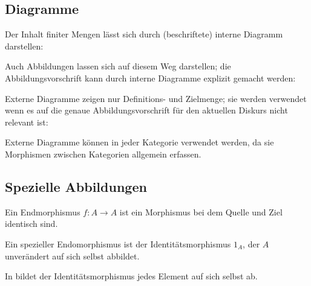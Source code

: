 \documentclass[parskip=half]{scrreprt}
\begin{document}
\newpage
\subsection{Diagramme}

\begin{remark}
Der Inhalt finiter Mengen lässt sich durch (beschriftete) interne Diagramm 
darstellen:


Auch Abbildungen lassen sich auf diesem Weg darstellen;
die Abbildungsvorschrift kann durch interne Diagramme explizit gemacht werden:

\end{remark}

\begin{remark}
Externe Diagramme zeigen nur Definitions- und Zielmenge; 
sie werden verwendet wenn es auf die genaue Abbildungsvorschrift für den 
aktuellen Diskurs nicht relevant ist:


Externe Diagramme können in jeder Kategorie verwendet werden,
da sie Morphismen zwischen Kategorien allgemein erfassen.
\end{remark}

\newpage
\subsection{Spezielle Abbildungen}

\begin{definition}[Endomorphismus]
Ein Endmorphismus $f: A → A$ ist ein Morphismus bei dem Quelle und Ziel 
identisch sind.
\end{definition}

\begin{definition}[Identitätsmprphismus]
Ein spezieller Endomorphismus ist der Identitätsmorphismus $1_A$,
der $A$ unverändert auf sich selbst abbildet. 
\end{definition}

\begin{remark}
In  bildet der Identitätsmorphismus jedes Element auf sich selbst ab.
\end{remark}
\end{document}
